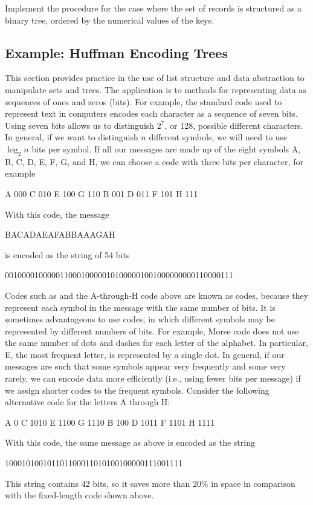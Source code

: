 \begin{exercise}
	\label{Exercise 2.66}
	Implement the  procedure for the case where the set of records is structured as a binary tree, ordered by the numerical values of the keys.
\end{exercise}



\subsection{Example: Huffman Encoding Trees}
\label{Section 2.3.4}

This section provides practice in the use of list structure and data abstraction to manipulate sets and trees.
The application is to methods for representing data as sequences of ones and zeros (bits).
For example, the  standard code used to represent text in computers encodes each character as a sequence of seven bits.
Using seven bits allows us to distinguish \( 2^7 \), or 128, possible different characters.
In general, if we want to distinguish \( n \) different symbols, we will need to use \( \log_2 n \) bits per symbol.
If all our messages are made up of the eight symbols A, B, C, D, E, F, G, and H, we can choose a code with three bits per character, for example
\begin{example}
	A 000    C 010    E 100    G 110
	B 001    D 011    F 101    H 111
\end{example}
With this code, the message
\begin{example}
	BACADAEAFABBAAAGAH
\end{example}
is encoded as the string of 54 bits
\begin{example}
	001000010000011000100000101000001001000000000110000111
\end{example}

Codes such as  and the A-through-H code above are known as  codes, because they represent each symbol in the message with the same number of bits.
It is sometimes advantageous to use  codes, in which different symbols may be represented by different numbers of bits.
For example, Morse code does not use the same number of dots and dashes for each letter of the alphabet.
In particular, E, the most frequent letter, is represented by a single dot.
In general, if our messages are such that some symbols appear very frequently and some very rarely, we can encode data more efficiently (i.e., using fewer bits per message) if we assign shorter codes to the frequent symbols.
Consider the following alternative code for the letters A through H:
\begin{example}
	A 0      C 1010    E 1100    G 1110
	B 100    D 1011    F 1101    H 1111
\end{example}
With this code, the same message as above is encoded as the string
\begin{example}
	100010100101101100011010100100000111001111
\end{example}
This string contains \( 42 \) bits, so it saves more than \( 20\% \) in space in comparison with the fixed-length code shown above.

